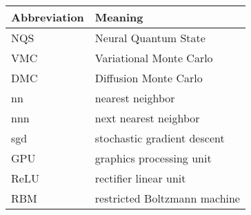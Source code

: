 \noindent\\\\

\begin{tabular}[h]{p{3cm}|l}
	Abbreviation & Meaning\\
	\hline
	NQS & Neural Quantum State\\
	VMC & Variational Monte Carlo\\
	DMC & Diffusion Monte Carlo\\
	nn & nearest neighbor\\
	nnn & next nearest neighbor\\
	sgd & stochastic gradient descent\\
	GPU & graphics processing unit\\
	ReLU & rectifier linear unit\\
	RBM & restricted Boltzmann machine\\
\end{tabular}
\newpage